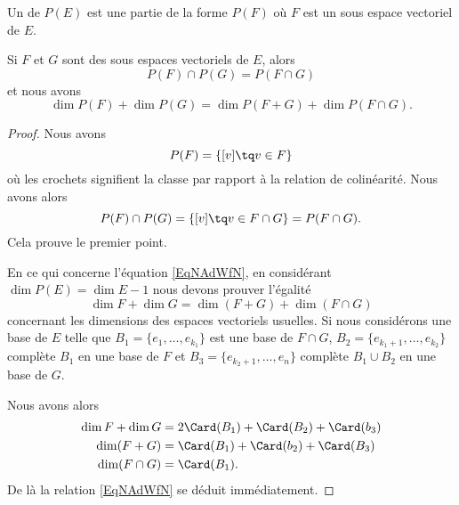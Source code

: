 Un  de \( P(E)\) est une partie de la forme \( P(F)\) où \( F\) est un sous espace vectoriel de \( E\).

\begin{proposition}     \label{PropuqpWVx}
    Si \( F\) et \( G\) sont des sous espaces vectoriels de \( E\), alors
    \begin{equation}
        P(F)\cap P(G)=P(F\cap G)
    \end{equation}
    et nous avons
    \begin{equation}        \label{EqNAdWfN}
        \dim P(F)+\dim P(G)=\dim P(F+G)+\dim P(F\cap G).
    \end{equation}
\end{proposition}

\begin{proof}
    Nous avons 
    \begin{equation}
        P(F)=\{ [v]\tq v\in F \}
    \end{equation}
    où les crochets signifient la classe par rapport à la relation de colinéarité. Nous avons alors
    \begin{equation}
        P(F)\cap P(G)=\{ [v]\tq v\in F\cap G \}=P(F\cap G).
    \end{equation}
    Cela prouve le premier point.

    En ce qui concerne l'équation \eqref{EqNAdWfN}, en considérant \( \dim P(E)=\dim E-1\) nous devons prouver l'égalité
    \begin{equation}
        \dim F+\dim G=\dim (F+G)+\dim(F\cap G)
    \end{equation}
    concernant les dimensions des espaces vectoriels usuelles. Si nous considérons une base de \( E\) telle que \( B_1=\{ e_1,\ldots, e_{k_1} \}\) est une base de \( F\cap G\), \( B_2=\{ e_{k_1+1},\ldots, e_{k_2} \}\) complète \( B_1\) en une base de \( F\) et \( B_3=\{ e_{k_2+1},\ldots, e_n \}\) complète \( B_1\cup B_2\) en une base de \( G\).

    Nous avons alors
    \begin{subequations}
        \begin{align}
            \dim F+\dim G&=2\Card(B_1)+\Card(B_2)+\Card(b_3)\\
            \dim(F+G)&=\Card(B_1)+\Card(b_2)+\Card(B_3)\\
            \dim(F\cap G)&=\Card(B_1).
        \end{align}
    \end{subequations}
    De là la relation \eqref{EqNAdWfN} se déduit immédiatement.    
\end{proof}

